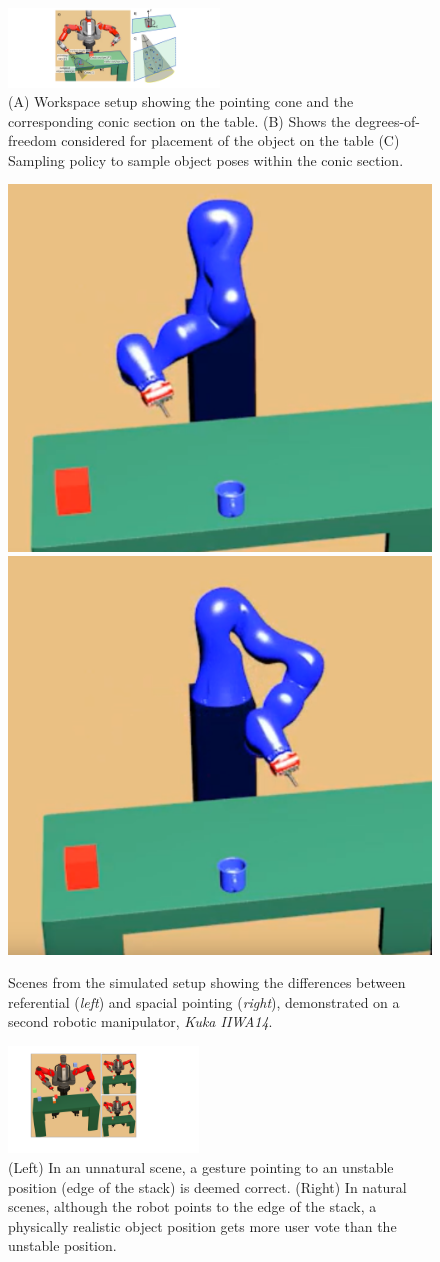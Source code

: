 
\begin{figure}[th!]
    \centering
    \includegraphics[width=0.5\textwidth]{pointing_diagram}
    \caption{(A) Workspace setup showing the pointing cone and the corresponding conic section on the table. (B) Shows the degrees-of-freedom considered for placement of the object on the table (C) Sampling policy to sample object poses within the conic section.}
    \label{fig:pointing}
\end{figure}

\begin{figure}[h!]
    \centering
    \includegraphics[height=0.20\textwidth]{figures/kuka_ref.png}
    \includegraphics[height=0.20\textwidth]{figures/kuka_spatial.png}
    \caption{Scenes from the simulated setup showing the differences between referential (\textit{left}) and spacial pointing (\textit{right}), demonstrated on a second robotic manipulator, \textit{Kuka IIWA14}.}
    \label{fig:spatial}
\end{figure}

\begin{figure}[h!]
    \centering
    \includegraphics[width=0.45\textwidth]{natural.pdf}
    \caption{(Left) In an unnatural scene, a gesture pointing to an unstable position (edge of the stack) is deemed correct. (Right) In natural scenes, although the robot points to the edge of the stack, a physically realistic object position gets more user vote than the unstable position.}
    \label{fig:natural}
\end{figure}

